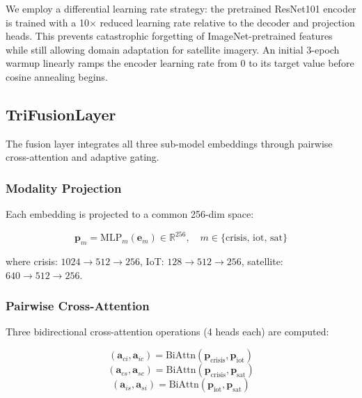 \documentclass[journal]{IEEEtran}
\begin{document}
We employ a differential learning rate strategy: the pretrained ResNet101 encoder is trained with a 10$\times$ reduced learning rate relative to the decoder and projection heads. This prevents catastrophic forgetting of ImageNet-pretrained features while still allowing domain adaptation for satellite imagery. An initial 3-epoch warmup linearly ramps the encoder learning rate from 0 to its target value before cosine annealing begins.

\subsection{TriFusionLayer}

The fusion layer integrates all three sub-model embeddings through pairwise cross-attention and adaptive gating.

\subsubsection{Modality Projection}

Each embedding is projected to a common 256-dim space:

\begin{equation}
\mathbf{p}_m = \text{MLP}_m(\mathbf{e}_m) \in \mathbb{R}^{256}, \quad m \in \{\text{crisis, iot, sat}\}
\end{equation}

where crisis: $1024 \to 512 \to 256$, IoT: $128 \to 512 \to 256$, satellite: $640 \to 512 \to 256$.

\subsubsection{Pairwise Cross-Attention}

Three bidirectional cross-attention operations (4 heads each) are computed:

\begin{equation}
(\mathbf{a}_{ci}, \mathbf{a}_{ic}) = \text{BiAttn}(\mathbf{p}_\text{crisis}, \mathbf{p}_\text{iot})
\end{equation}
\begin{equation}
(\mathbf{a}_{cs}, \mathbf{a}_{sc}) = \text{BiAttn}(\mathbf{p}_\text{crisis}, \mathbf{p}_\text{sat})
\end{equation}
\begin{equation}
(\mathbf{a}_{is}, \mathbf{a}_{si}) = \text{BiAttn}(\mathbf{p}_\text{iot}, \mathbf{p}_\text{sat})
\end{equation}
\end{document}
